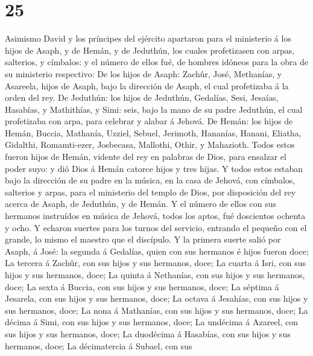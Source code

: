 \hypertarget{section-24}{%
\section{25}\label{section-24}}

 Asimismo David y los príncipes del ejército apartaron para
el ministerio á los hijos de Asaph, y de Hemán, y de Jeduthún, los
cuales profetizasen con arpas, salterios, y címbalos: y el número de
ellos fué, de hombres idóneos para la obra de su ministerio respectivo:
 De los hijos de Asaph: Zachûr, José, Methanías, y Asareela,
hijos de Asaph, bajo la dirección de Asaph, el cual profetizaba á la
orden del rey.  De Jeduthún: los hijos de Jeduthún,
Gedalías, Sesi, Jesaías, Hasabías, y Mathithías, y Simi: seis, bajo la
mano de su padre Jeduthún, el cual profetizaba con arpa, para celebrar y
alabar á Jehová.  De Hemán: los hijos de Hemán, Buccia,
Mathanía, Uzziel, Sebuel, Jerimoth, Hananías, Hanani, Eliatha, Gidalthi,
Romamti-ezer, Josbecasa, Mallothi, Othir, y Mahazioth. 
Todos estos fueron hijos de Hemán, vidente del rey en palabras de Dios,
para ensalzar el poder suyo: y dió Dios á Hemán catorce hijos y tres
hijas.  Y todos estos estaban bajo la dirección de su padre
en la música, en la casa de Jehová, con címbalos, salterios y arpas,
para el ministerio del templo de Dios, por disposición del rey acerca de
Asaph, de Jeduthún, y de Hemán.  Y el número de ellos con
sus hermanos instruídos en música de Jehová, todos los aptos, fué
doscientos ochenta y ocho.  Y echaron suertes para los
turnos del servicio, entrando el pequeño con el grande, lo mismo el
maestro que el discípulo.  Y la primera suerte salió por
Asaph, á José: la segunda á Gedalías, quien con sus hermanos é hijos
fueron doce;  La tercera á Zachûr, con sus hijos y sus
hermanos, doce;  La cuarta á Isri, con sus hijos y sus
hermanos, doce;  La quinta á Nethanías, con sus hijos y sus
hermanos, doce;  La sexta á Buccia, con sus hijos y sus
hermanos, doce;  La séptima á Jesarela, con sus hijos y sus
hermanos, doce;  La octava á Jesahías, con sus hijos y sus
hermanos, doce;  La nona á Mathanías, con sus hijos y sus
hermanos, doce;  La décima á Simi, con sus hijos y sus
hermanos, doce;  La undécima á Azareel, con sus hijos y sus
hermanos, doce;  La duodécima á Hasabías, con sus hijos y
sus hermanos, doce;  La décimatercia á Subael, con sus

